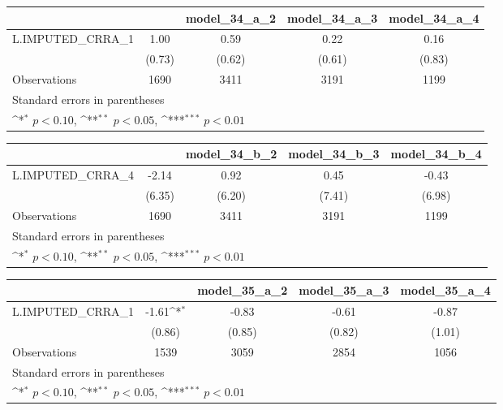 {
\def\sym#1{\ifmmode^{#1}\else\(^{#1}\)\fi}
\begin{tabular}{l*{4}{c}}
\toprule
                &\multicolumn{1}{c}{}&\multicolumn{1}{c}{model\_34\_a\_2}&\multicolumn{1}{c}{model\_34\_a\_3}&\multicolumn{1}{c}{model\_34\_a\_4}\\
\midrule
L.IMPUTED\_CRRA\_1&     1.00         &     0.59         &     0.22         &     0.16         \\
                &   (0.73)         &   (0.62)         &   (0.61)         &   (0.83)         \\
\midrule
Observations    &     1690         &     3411         &     3191         &     1199         \\
\bottomrule
\multicolumn{5}{l}{\footnotesize Standard errors in parentheses}\\
\multicolumn{5}{l}{\footnotesize \sym{*} \(p<0.10\), \sym{**} \(p<0.05\), \sym{***} \(p<0.01\)}\\
\end{tabular}
}
{
\def\sym#1{\ifmmode^{#1}\else\(^{#1}\)\fi}
\begin{tabular}{l*{4}{c}}
\toprule
                &\multicolumn{1}{c}{}&\multicolumn{1}{c}{model\_34\_b\_2}&\multicolumn{1}{c}{model\_34\_b\_3}&\multicolumn{1}{c}{model\_34\_b\_4}\\
\midrule
L.IMPUTED\_CRRA\_4&    -2.14         &     0.92         &     0.45         &    -0.43         \\
                &   (6.35)         &   (6.20)         &   (7.41)         &   (6.98)         \\
\midrule
Observations    &     1690         &     3411         &     3191         &     1199         \\
\bottomrule
\multicolumn{5}{l}{\footnotesize Standard errors in parentheses}\\
\multicolumn{5}{l}{\footnotesize \sym{*} \(p<0.10\), \sym{**} \(p<0.05\), \sym{***} \(p<0.01\)}\\
\end{tabular}
}
{
\def\sym#1{\ifmmode^{#1}\else\(^{#1}\)\fi}
\begin{tabular}{l*{4}{c}}
\toprule
                &\multicolumn{1}{c}{}&\multicolumn{1}{c}{model\_35\_a\_2}&\multicolumn{1}{c}{model\_35\_a\_3}&\multicolumn{1}{c}{model\_35\_a\_4}\\
\midrule
L.IMPUTED\_CRRA\_1&    -1.61\sym{*}  &    -0.83         &    -0.61         &    -0.87         \\
                &   (0.86)         &   (0.85)         &   (0.82)         &   (1.01)         \\
\midrule
Observations    &     1539         &     3059         &     2854         &     1056         \\
\bottomrule
\multicolumn{5}{l}{\footnotesize Standard errors in parentheses}\\
\multicolumn{5}{l}{\footnotesize \sym{*} \(p<0.10\), \sym{**} \(p<0.05\), \sym{***} \(p<0.01\)}\\
\end{tabular}
}
